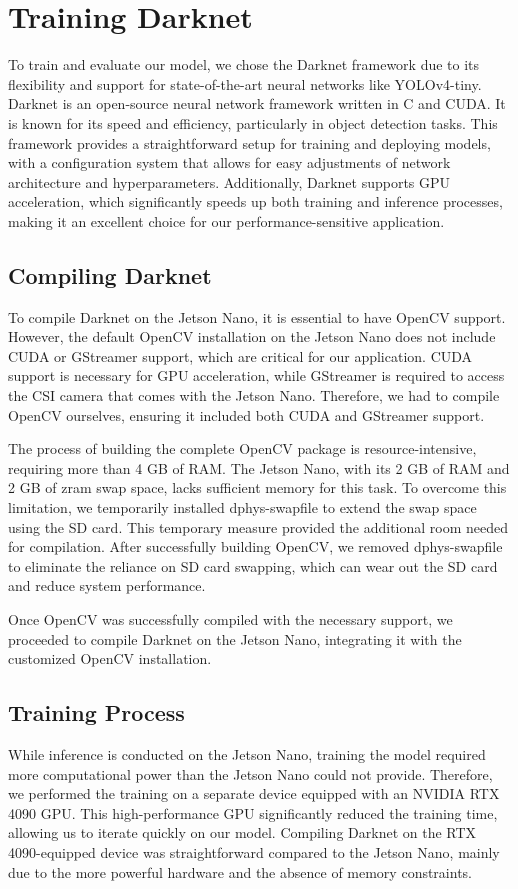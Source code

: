 \newpage 
\section{Training Darknet}
\label{sec:training}
To train and evaluate our model, we chose the Darknet framework due to its flexibility and support for state-of-the-art neural networks like YOLOv4-tiny. Darknet is an open-source neural network framework written in C and CUDA. It is known for its speed and efficiency, particularly in object detection tasks. This framework provides a straightforward setup for training and deploying models, with a configuration system that allows for easy adjustments of network architecture and hyperparameters. Additionally, Darknet supports GPU acceleration, which significantly speeds up both training and inference processes, making it an excellent choice for our performance-sensitive application.

\subsection{Compiling Darknet}
To compile Darknet on the Jetson Nano, it is essential to have OpenCV support. However, the default OpenCV installation on the Jetson Nano does not include CUDA or GStreamer support, which are critical for our application. CUDA support is necessary for GPU acceleration, while GStreamer is required to access the CSI camera that comes with the Jetson Nano. Therefore, we had to compile OpenCV ourselves, ensuring it included both CUDA and GStreamer support.

The process of building the complete OpenCV package is resource-intensive, requiring more than 4 GB of RAM. The Jetson Nano, with its 2 GB of RAM and 2 GB of zram swap space, lacks sufficient memory for this task. To overcome this limitation, we temporarily installed dphys-swapfile to extend the swap space using the SD card. This temporary measure provided the additional room needed for compilation. After successfully building OpenCV, we removed dphys-swapfile to eliminate the reliance on SD card swapping, which can wear out the SD card and reduce system performance.

Once OpenCV was successfully compiled with the necessary support, we proceeded to compile Darknet on the Jetson Nano, integrating it with the customized OpenCV installation.

\subsection{Training Process}
While inference is conducted on the Jetson Nano, training the model required more computational power than the Jetson Nano could not provide. Therefore, we performed the training on a separate device equipped with an NVIDIA RTX 4090 GPU. This high-performance GPU significantly reduced the training time, allowing us to iterate quickly on our model. Compiling Darknet on the RTX 4090-equipped device was straightforward compared to the Jetson Nano, mainly due to the more powerful hardware and the absence of memory constraints.

